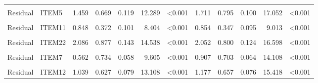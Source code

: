 \documentclass[
]{article}
\begin{document}
\begin{table}
\begin{tabular}[t]{llrrrrlrrrrl}
\cellcolor{gray!6}{Residual} & \cellcolor{gray!6}{ITEM20} & \cellcolor{gray!6}{0.954} & \cellcolor{gray!6}{0.461} & \cellcolor{gray!6}{0.093} & \cellcolor{gray!6}{10.210} & \cellcolor{gray!6}{<0.001} & \cellcolor{gray!6}{0.983} & \cellcolor{gray!6}{0.500} & \cellcolor{gray!6}{0.057} & \cellcolor{gray!6}{17.125} & \cellcolor{gray!6}{<0.001}\\
Residual & ITEM5 & 1.459 & 0.669 & 0.119 & 12.289 & <0.001 & 1.711 & 0.795 & 0.100 & 17.052 & <0.001\\
\cellcolor{gray!6}{Residual} & \cellcolor{gray!6}{ITEM10} & \cellcolor{gray!6}{0.806} & \cellcolor{gray!6}{0.370} & \cellcolor{gray!6}{0.094} & \cellcolor{gray!6}{8.530} & \cellcolor{gray!6}{<0.001} & \cellcolor{gray!6}{0.803} & \cellcolor{gray!6}{0.328} & \cellcolor{gray!6}{0.090} & \cellcolor{gray!6}{8.944} & \cellcolor{gray!6}{<0.001}\\
Residual & ITEM11 & 0.848 & 0.372 & 0.101 & 8.404 & <0.001 & 0.854 & 0.347 & 0.095 & 9.013 & <0.001\\
\cellcolor{gray!6}{Residual} & \cellcolor{gray!6}{ITEM15} & \cellcolor{gray!6}{0.934} & \cellcolor{gray!6}{0.745} & \cellcolor{gray!6}{0.119} & \cellcolor{gray!6}{7.870} & \cellcolor{gray!6}{<0.001} & \cellcolor{gray!6}{1.562} & \cellcolor{gray!6}{0.778} & \cellcolor{gray!6}{0.112} & \cellcolor{gray!6}{13.964} & \cellcolor{gray!6}{<0.001}\\
Residual & ITEM22 & 2.086 & 0.877 & 0.143 & 14.538 & <0.001 & 2.052 & 0.800 & 0.124 & 16.598 & <0.001\\
\cellcolor{gray!6}{Residual} & \cellcolor{gray!6}{ITEM4} & \cellcolor{gray!6}{0.696} & \cellcolor{gray!6}{0.800} & \cellcolor{gray!6}{0.066} & \cellcolor{gray!6}{10.568} & \cellcolor{gray!6}{<0.001} & \cellcolor{gray!6}{1.074} & \cellcolor{gray!6}{0.884} & \cellcolor{gray!6}{0.104} & \cellcolor{gray!6}{10.372} & \cellcolor{gray!6}{<0.001}\\
Residual & ITEM7 & 0.562 & 0.734 & 0.058 & 9.605 & <0.001 & 0.907 & 0.703 & 0.064 & 14.108 & <0.001\\
\cellcolor{gray!6}{Residual} & \cellcolor{gray!6}{ITEM9} & \cellcolor{gray!6}{1.176} & \cellcolor{gray!6}{0.662} & \cellcolor{gray!6}{0.115} & \cellcolor{gray!6}{10.247} & \cellcolor{gray!6}{<0.001} & \cellcolor{gray!6}{1.194} & \cellcolor{gray!6}{0.536} & \cellcolor{gray!6}{0.097} & \cellcolor{gray!6}{12.297} & \cellcolor{gray!6}{<0.001}\\
Residual & ITEM12 & 1.039 & 0.627 & 0.079 & 13.108 & <0.001 & 1.177 & 0.657 & 0.076 & 15.418 & <0.001\\

\end{tabular}
\end{table}
\end{document}
